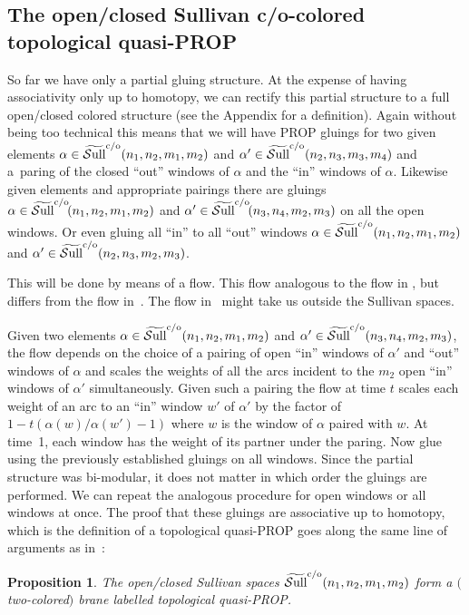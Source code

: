 \documentclass[pdftex]{sigma}
\newtheorem{prop}[thm]{Proposition}
\def\wSull{\widetilde{\rm {\mathcal S}ull}^{\rm c/o}}
\def\a{\alpha}
\begin{document}
\subsection{The open/closed Sullivan  c/o-colored topological quasi-PROP}
So far we have only a partial gluing structure. At the expense of
having associativity only up to homotopy, we can rectify this
partial structure to a full open/closed colored structure (see the
Appendix for a def\/inition). Again without being too technical this
means that we will have PROP gluings for two given elements  $\alpha
\in \wSull(n_1,n_2,m_1,m_2)$ and $\alpha'
\in\wSull(n_2,n_3,m_3,m_4)$ and a~paring of the closed ``out''
windows of $\alpha$ and the ``in'' windows of $\alpha$. Likewise
given elements and appropriate pairings there are gluings $\alpha
\in \wSull\!(n_1,n_2,m_1,m_2)$ and $\alpha'
\in\wSull\!(n_3,n_4,m_2,m_3)$ on all the open windows. Or even gluing
all ``in'' to all ``out'' windows $\alpha
\in\wSull(n_1,n_2,m_1,m_2)$ and $\alpha'
\in\wSull(n_2,n_3,m_2,m_3)$.

This will be done by means of a f\/low. This f\/low analogous to the f\/low in \cite{hoch1}, but
dif\/fers from the f\/low in~\cite{KP}. The f\/low in~\cite{KP} might take us outside the Sullivan spaces.

Given two elements $\alpha \in \wSull(n_1,n_2,m_1,m_2)$ and $\alpha'
\in \wSull(n_3,n_4,  m_2, m_3)$, the f\/low depends on the
choice of a pairing of open ``in'' windows of $\a'$ and ``out''
windows of $\a$ and  scales the weights of all the arcs incident to
the $m_2$ open ``in'' windows of $\alpha'$ simultaneously. Given
such a pairing the f\/low at time $t$ scales each weight of an arc to
an ``in''  window $w'$ of $\a'$ by the factor of
$1-t(\alpha(w)/\alpha(w')-1)$  where $w$ is the window of $\a$
paired with $w$. At time~1, each window has the weight of its
partner under the paring.  Now glue using the previously established
gluings on all windows. Since the partial structure was bi-modular,
it does not matter in which order the gluings are performed. We can
repeat the analogous procedure for open windows or all windows at
once. The proof that these gluings are associative up to homotopy,
which is the def\/inition of a topological quasi-PROP goes along the
same line of arguments as in~\cite[Section~5.6]{hoch1}:

\begin{prop}
The open/closed Sullivan spaces $\wSull(n_1,n_2,m_1,m_2)$
form a $($two-colored$)$ brane labelled topological quasi-PROP.
\end{prop}
\end{document}
